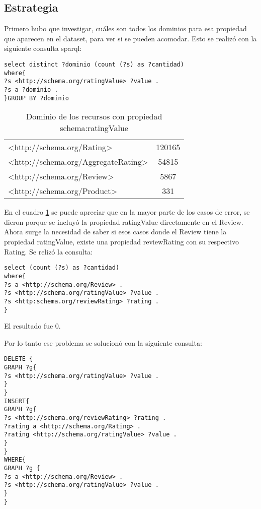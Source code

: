 \subsection*{Estrategia}
Primero hubo que investigar, cuáles son todos los dominios para esa propiedad que aparecen en el dataset, para ver si se pueden 
acomodar. Esto se realizó con la siguiente consulta sparql:

\begin{lstlisting}[frame=single]  
select distinct ?dominio (count (?s) as ?cantidad) 
where{
?s <http://schema.org/ratingValue> ?value .
?s a ?dominio .
}GROUP BY ?dominio
\end{lstlisting}

\begin{table}[h]
\begin{tabular}{| l | c |}
 <http://schema.org/Rating> & 120165\\
 <http://schema.org/AggregateRating> & 54815 \\
 <http://schema.org/Review> & 5867 \\
 <http://schema.org/Product> & 331 \\
\end{tabular}
\caption{Dominio de los recursos con propiedad schema:ratingValue}
\label{table:ratingValueDomains}
\end{table}

En el cuadro \ref{table:ratingValueDomains} se puede apreciar que en la mayor parte de los casos de error, se dieron porque se incluyó la propiedad ratingValue directamente en 
el Review. Ahora surge la necesidad de saber si esos casos donde el Review tiene la propiedad ratingValue, existe una propiedad reviewRating 
con su respectivo Rating.
Se relizó la consulta:

\begin{lstlisting}[frame=single]  
select (count (?s) as ?cantidad) 
where{
?s a <http://schema.org/Review> . 
?s <http://schema.org/ratingValue> ?value . 
?s <http:schema.org/reviewRating> ?rating . 
}
\end{lstlisting}

El resultado fue 0.

Por lo tanto ese problema se solucionó con la siguiente consulta:

\begin{lstlisting}[frame=single]  
DELETE { 
GRAPH ?g{ 
?s <http://schema.org/ratingValue> ?value . 
} 
} 
INSERT{ 
GRAPH ?g{ 
?s <http://schema.org/reviewRating> ?rating . 
?rating a <http://schema.org/Rating> . 
?rating <http://schema.org/ratingValue> ?value . 
}
}
WHERE{
GRAPH ?g {
?s a <http://schema.org/Review> .
?s <http://schema.org/ratingValue> ?value .
}
}
\end{lstlisting}

